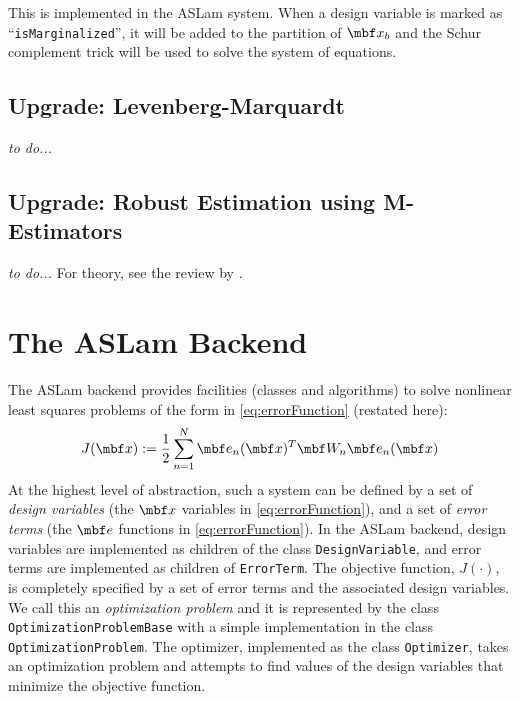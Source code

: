 \documentclass[11pt,a4,oneside]{article}
\newcommand{\txt}[1]{{\footnotesize\texttt{#1}}}
\begin{document}
This is implemented in the ASLam system. When a design variable is marked as ``\txt{isMarginalized}'', it will be added to the partition of $\mbf x_b$ and the Schur complement trick will be used to solve the system of equations.
\subsection{Upgrade: Levenberg-Marquardt \label{ss:LM}}
{\em to do...}
\subsection{Upgrade: Robust Estimation using M-Estimators \label{ss:M-Estimators}}
{\em to do...} For theory, see the review by \citet{Zhang9700}. 

\section{The ASLam Backend}
The ASLam backend provides facilities (classes and algorithms) to solve nonlinear least squares problems of the form in \eqref{eq:errorFunction} (restated here):
\begin{equation*}
  J(\mbf x) := \frac{1}{2}\sum_{n=1}^N \mbf e_n(\mbf x)^T \mbf W_{n} \mbf e_n(\mbf x)
\end{equation*}
 At the highest level of abstraction, such a system can be defined by a set of {\em design variables} (the $\mbf x$ variables in \eqref{eq:errorFunction}), and a set of {\em error terms} (the $\mbf e$ functions in \eqref{eq:errorFunction}). In the ASLam backend, design variables are implemented as children of the class \txt{DesignVariable}, and error terms are implemented as children of \txt{ErrorTerm}. The objective function, $J(\cdot)$, is completely specified by a set of error terms and the associated design variables. We call this an {\em optimization problem} and it is represented by the class \txt{OptimizationProblemBase} with a simple implementation in the class \txt{OptimizationProblem}. The optimizer, implemented as the class \txt{Optimizer}, takes an optimization problem and attempts to find values of the design variables that minimize the objective function. 
\end{document}
